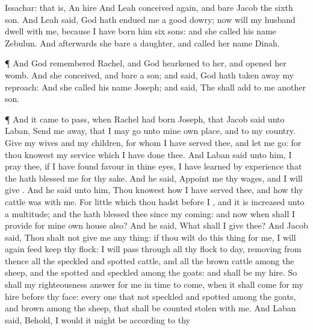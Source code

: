 {{Issachar: that is, An hire}
And
Leah
conceived again, and
bare
Jacob the
sixth
son.
And
Leah
said,
God hath
endued me
{} a
good
dowry;
now will my
husband
dwell with me, because I have
born him
six
sons: and she
called his
name
Zebulun.
And
afterwards she
bare a
daughter, and
called her
name
Dinah.
\par }{\PP {}¶ And
God
remembered
Rachel, and
God
hearkened to her, and
opened her
womb.
And she
conceived, and
bare a
son; and
said,
God hath taken
away my
reproach:
And she
called his
name
Joseph; and
said, The
{} shall
add to me
another
son.
\par }{\PP {}¶ And it came to pass, when
Rachel had
born
Joseph, that
Jacob
said unto
Laban, Send me
away, that I may
go unto mine own
place, and to my
country.
Give
{} my
wives and my
children,
for whom I have
served thee, and let me
go: for thou
knowest my
service which I have
done thee.
And
Laban
said unto him, I pray thee, if I have
found
favour in thine
eyes,
{} I have learned by
experience that the
{} hath
blessed me for thy
sake.
And he
said,
Appoint me thy
wages, and I will
give
{}.
And he
said unto him, Thou
knowest
how I have
served thee, and
how thy
cattle was with me.
For
{}
little which thou hadst before
I
{}, and it is
{}
increased unto a
multitude; and the
{} hath
blessed thee since my
coming: and now
when shall I
provide for mine own
house also?
And he
said, What shall I give
thee? And
Jacob
said, Thou shalt not
give me any
thing: if thou wilt
do this
thing for me, I will
again
feed
{}
keep thy
flock:
I will
pass through all thy
flock to
day,
removing from thence all the
speckled and
spotted
cattle, and all the
brown
cattle among the
sheep, and the
spotted and
speckled among the
goats: and
{} shall be my
hire.
So shall my
righteousness
answer for me in
time to
come, when it shall
come for my
hire before thy
face: every
one that
{} not
speckled and
spotted among the
goats, and
brown among the
sheep, that shall be counted
stolen with me.
And
Laban
said, Behold, I would it might
be according to thy
}
